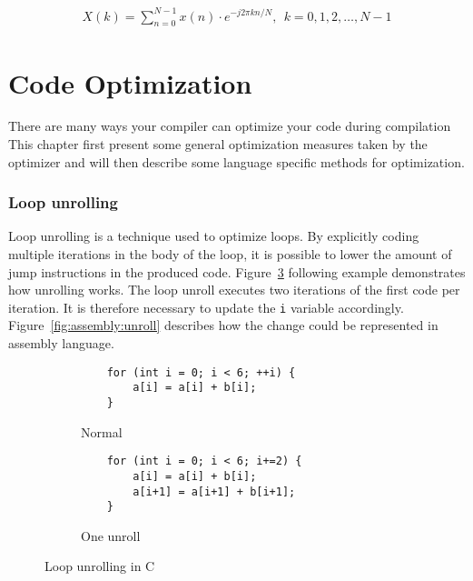 \begin{align}
    X\left(k\right) = \sum\limits_{n=0}^{N-1}x\left(n\right)\cdot e^{-j2\pi kn/N},\ \ k = 0,1,2,\dots,N-1\label{eq:1}
\end{align}

\section{Code Optimization}

There are many ways your compiler can optimize your code during compilation This chapter first present some general optimization measures taken by the optimizer and will then describe some language specific methods for optimization.

\subsubsection{Loop unrolling}
Loop unrolling is a technique used to optimize loops. By explicitly coding multiple iterations in the body of the loop, it is possible to lower the amount of jump instructions in the produced code. Figure~\ref{fig:c:unroll} following example demonstrates how unrolling works. The loop unroll executes two iterations of the first code per iteration. It is therefore necessary to update the \texttt{i} variable accordingly. Figure~\ref{fig:assembly:unroll} describes how the change could be represented in assembly language.

\begin{figure}[H]
    \centering
    \begin{subfigure}{.5\textwidth}
        \centering
        \begin{verbatim}
    for (int i = 0; i < 6; ++i) {
        a[i] = a[i] + b[i];
    }

        \end{verbatim}
        \caption{Normal}
        \label{fig:c:unroll:normal}
    \end{subfigure}%
    \begin{subfigure}{.5\textwidth}
        \centering
        \begin{verbatim}
    for (int i = 0; i < 6; i+=2) {
        a[i] = a[i] + b[i];
        a[i+1] = a[i+1] + b[i+1];
    }
        \end{verbatim}
        \caption{One unroll}
        \label{fig:c:unroll:unroll}
    \end{subfigure}
    \caption{Loop unrolling in C}
    \label{fig:c:unroll}
\end{figure}


